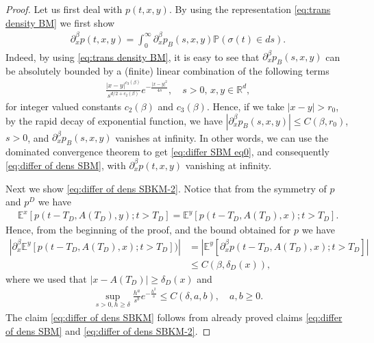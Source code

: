 \documentclass[reqno]{amsart}
\theoremstyle{remark}
\numberwithin{equation}{section} %
\newcommand{\de}{\delta_D}
\newcommand{\1}{\mathds{1}}
\begin{document}
	\begin{proof}
		Let us first deal with $p(t,x,y)$. By using the representation \eqref{eq:trans density BM} we first show
		\begin{align}\label{eq:differ SBM eq0}
			\partial^\beta_xp(t,x,y)=\int_0^\infty \partial^\beta_x p_B(s,x,y)\mathds{P}(\sigma(t)\in ds).
		\end{align}
		Indeed, by using \eqref{eq:trans density BM}, it is easy to see that $\partial^\beta_x p_B(s,x,y)$ can be absolutely bounded by a (finite) linear combination of the following terms 
		\begin{align*}
			\frac{|x-y|^{c_3(\beta)}}{s^{d/2+c_2(\beta)}}e^{-\frac{|x-y|^2}{4s}}, \quad s>0,\,x,y\in \mathbb{R}^d,
		\end{align*}
		for integer valued constants $c_2(\beta)$ and $c_3(\beta)$. Hence, if we take $|x-y|>r_0$, by the rapid decay of exponential function, we have $|\partial^\beta_x p_B(s,x,y)|\le C(\beta,r_0)$, $s>0$, and $\partial^\beta_x p_B(s,x,y)$ vanishes at infinity. In other words, we can use the dominated convergence theorem to get \eqref{eq:differ SBM eq0}, and consequently \eqref{eq:differ of dens SBM}, with $\partial^\beta_x p(t,x,y)$ vanishing at infinity.
		
		Next we show \eqref{eq:differ of dens SBKM-2}. Notice that from the symmetry of $p$ and $p^D$ we have
		\begin{align}\label{eq:symmetry of transition remainder}
			\mathds{E}^x\left[p(t-T_D,A({T_D}),y);t>T_D\right]=\mathds{E}^y\left[p(t-T_D,A({T_D}),x);t>T_D\right].
		\end{align}
		Hence, from the beginning of the proof, and the bound obtained for $p$ we have \begin{align*}
			|\partial^\beta_x\mathds{E}^y\left[p(t-T_D,A({T_D}),x);t>T_D\right])|&=|\mathds{E}^y\left[\partial^\beta_x p(t-T_D,A({T_D}),x);t>T_D\right]|\\&\le C(\beta,\de(x)),
		\end{align*}
		where we used that $|x-A({T_D})|\ge \de(x)$ and
		\begin{align*}
			\sup_{s>0,h\ge\delta}\frac{h^a}{s^{b}}e^{-\frac{h^2}{s}}\le C(\delta,a,b),\quad a,b\ge 0.
		\end{align*}
		The claim \eqref{eq:differ of dens SBKM} follows from already proved claims \eqref{eq:differ of dens SBM} and \eqref{eq:differ of dens SBKM-2}.
	\end{proof}
	
\end{document}
